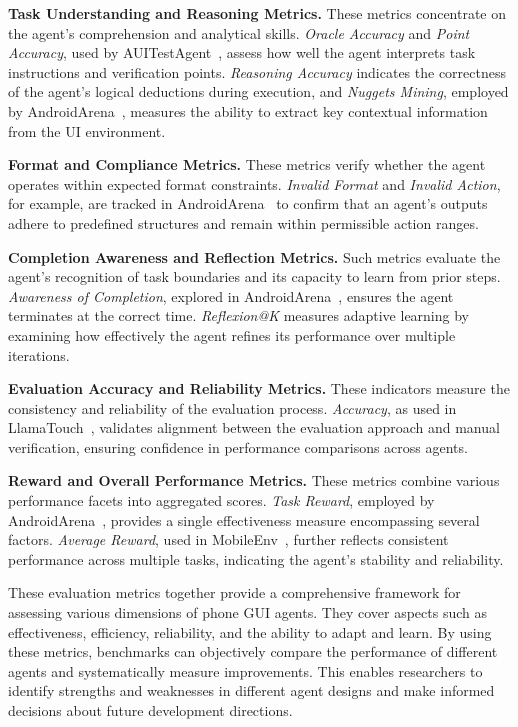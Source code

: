 \noindent\textbf{Task Understanding and Reasoning Metrics.}
These metrics concentrate on the agent’s comprehension and analytical skills. \emph{Oracle Accuracy} and \emph{Point Accuracy}, used by AUITestAgent~\cite{hu2024auitestagent}, assess how well the agent interprets task instructions and verification points. \emph{Reasoning Accuracy} indicates the correctness of the agent’s logical deductions during execution, and \emph{Nuggets Mining}, employed by AndroidArena~\cite{xing2024AndroidArena}, measures the ability to extract key contextual information from the UI environment.

\noindent\textbf{Format and Compliance Metrics.}
These metrics verify whether the agent operates within expected format constraints. \emph{Invalid Format} and \emph{Invalid Action}, for example, are tracked in AndroidArena~\cite{xing2024AndroidArena} to confirm that an agent’s outputs adhere to predefined structures and remain within permissible action ranges.

\noindent\textbf{Completion Awareness and Reflection Metrics.}
Such metrics evaluate the agent’s recognition of task boundaries and its capacity to learn from prior steps. \emph{Awareness of Completion}, explored in AndroidArena~\cite{xing2024AndroidArena}, ensures the agent terminates at the correct time. \emph{Reflexion@K} measures adaptive learning by examining how effectively the agent refines its performance over multiple iterations.

\noindent\textbf{Evaluation Accuracy and Reliability Metrics.}
These indicators measure the consistency and reliability of the evaluation process. \emph{Accuracy}, as used in LlamaTouch~\cite{zhang2024llamatouch}, validates alignment between the evaluation approach and manual verification, ensuring confidence in performance comparisons across agents.

\noindent\textbf{Reward and Overall Performance Metrics.}
These metrics combine various performance facets into aggregated scores. \emph{Task Reward}, employed by AndroidArena~\cite{xing2024AndroidArena}, provides a single effectiveness measure encompassing several factors. \emph{Average Reward}, used in MobileEnv~\cite{zhang2023mobileenv}, further reflects consistent performance across multiple tasks, indicating the agent’s stability and reliability.

These evaluation metrics together provide a comprehensive framework for assessing various dimensions of phone GUI agents. They cover aspects such as effectiveness, efficiency, reliability, and the ability to adapt and learn. By using these metrics, benchmarks can objectively compare the performance of different agents and systematically measure improvements. This enables researchers to identify strengths and weaknesses in different agent designs and make informed decisions about future development directions.